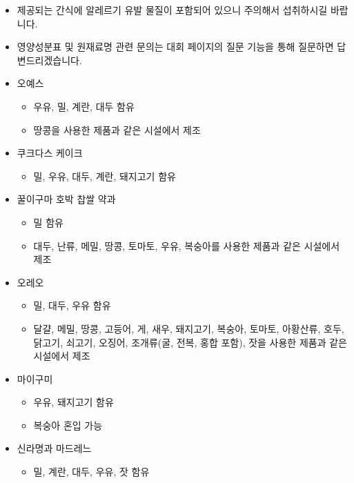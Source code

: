 \begin{itemize}[noitemsep]
    \item 제공되는 간식에 알레르기 유발 물질이 포함되어 있으니 주의해서 섭취하시길 바랍니다.
    \item 영양성분표 및 원재료명 관련 문의는 대회 페이지의 질문 기능을 통해 질문하면 답변드리겠습니다.
    \item 오예스
    \begin{itemize}[noitemsep,topsep=0pt]
        \item 우유, 밀, 계란, 대두 함유
        \item 땅콩을 사용한 제품과 같은 시설에서 제조
    \end{itemize}
    \item 쿠크다스 케이크
    \begin{itemize}[noitemsep,topsep=0pt]
        \item 밀, 우유, 대두, 계란, 돼지고기 함유
    \end{itemize}
    \item 꿀이구마 호박 찹쌀 약과
    \begin{itemize}[noitemsep,topsep=0pt]
        \item 밀 함유
        \item 대두, 난류, 메밀, 땅콩, 토마토, 우유, 복숭아를 사용한 제품과 같은 시설에서 제조
    \end{itemize}
    \item 오레오
    \begin{itemize}[noitemsep,topsep=0pt]
        \item 밀, 대두, 우유 함유
        \item 달걀, 메밀, 땅콩, 고등어, 게, 새우, 돼지고기, 복숭아, 토마토, 아황산류, 호두, 닭고기, 쇠고기, 오징어, 조개류(굴, 전복, 홍합 포함), 잣을 사용한 제품과 같은 시설에서 제조
    \end{itemize}
    \item 마이구미
    \begin{itemize}[noitemsep,topsep=0pt]
        \item 우유, 돼지고기 함유
        \item 복숭아 혼입 가능
    \end{itemize}
    \item 신라명과 마드레느
    \begin{itemize}[noitemsep,topsep=0pt]
        \item 밀, 계란, 대두, 우유, 잣 함유
    \end{itemize}
\end{itemize}